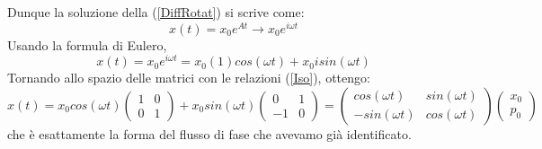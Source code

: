 \documentclass[a4paper,openany]{article}
\begin{document}
	Dunque la soluzione della (\ref{DiffRotat}) si scrive come:
	\begin{equation}
		x(t) = x_{0}e^{At} \rightarrow x_{0}e^{i\omega t}
	\end{equation}
	Usando la formula di Eulero,
	$$
	x(t) = x_{0}e^{i \omega t} = x_{0} (1) cos(\omega t) + x_{0}isin(\omega t)
	$$
	Tornando allo spazio delle matrici con le relazioni (\ref{Iso}), ottengo:
	$$
	x(t) = x_{0}cos(\omega t)
	\begin{pmatrix}
		1 & 0 \\
		0 & 1
	\end{pmatrix} + x_{0}sin(\omega t)
	\begin{pmatrix}
		0 & 1 \\
		-1 & 0
	\end{pmatrix} = 
	\begin{pmatrix}
		cos(\omega t) & sin(\omega t) \\
		-sin(\omega t) & cos(\omega t)
	\end{pmatrix}
	\begin{pmatrix}
		x_{0} \\
		p_{0}
	\end{pmatrix}
	$$ 
	che è esattamente la forma del flusso di fase che avevamo già identificato.
\end{document}
